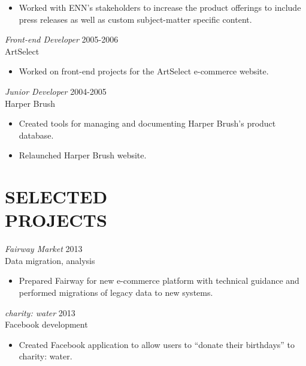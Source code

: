 \documentclass[line,margin]{res}
\begin{document}
\begin{resume}
\begin{itemize}
        \item
            Worked with ENN's stakeholders to increase the product offerings
            to include press releases as well as custom subject-matter
            specific content.

    \end{itemize}

    {\sl Front-end Developer}
    \hfill 2005-2006 \\
    ArtSelect
    \begin{itemize} \itemsep -2pt
        \item
            Worked on front-end projects for the ArtSelect e-commerce website.

    \end{itemize}

    {\sl Junior Developer}
    \hfill 2004-2005 \\
    Harper Brush
    \begin{itemize} \itemsep -2pt
        \item
            Created tools for managing and documenting Harper Brush's product
            database.

        \item
            Relaunched Harper Brush website.

    \end{itemize}



\section{SELECTED \\ PROJECTS}
    {\sl Fairway Market}
    \hfill 2013 \\
    Data migration, analysis
    \begin{itemize} \itemsep -2pt
        \item
            Prepared Fairway for new e-commerce platform with technical
            guidance and performed migrations of legacy data to new systems.

    \end{itemize}

    {\sl charity: water}
    \hfill 2013 \\
    Facebook development
    \begin{itemize} \itemsep -2pt
        \item
            Created Facebook application to allow users to ``donate their
            birthdays'' to charity: water.


\end{itemize}
\end{resume}
\end{document}

